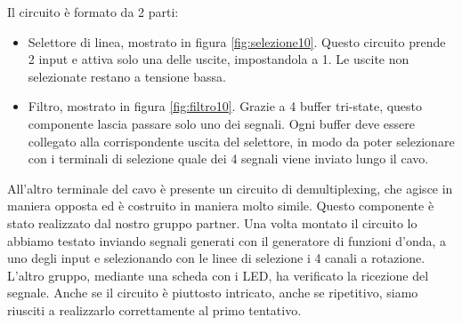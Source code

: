 Il circuito è formato da 2 parti:

\begin{itemize}
    \item{Selettore di linea, mostrato in figura \ref{fig:selezione10}. Questo circuito prende 2 input e
        attiva solo una delle uscite, impostandola a 1. Le uscite non selezionate restano a tensione bassa.}
    \item{Filtro, mostrato in figura \ref{fig:filtro10}. Grazie a 4 buffer tri-state, questo componente lascia
        passare solo uno dei segnali. Ogni buffer deve essere collegato alla corrispondente uscita del selettore,
        in modo da poter selezionare con i terminali di selezione quale dei 4 segnali viene inviato lungo il cavo.}
\end{itemize}

All'altro terminale del cavo è presente un circuito di demultiplexing, che agisce in maniera opposta ed è costruito in
maniera molto simile. Questo componente è stato realizzato dal nostro gruppo partner. Una volta montato il circuito
lo abbiamo testato inviando segnali generati con il generatore di funzioni d'onda, a uno degli input e selezionando
con le linee di selezione i 4 canali a rotazione. L'altro gruppo, mediante una scheda con i LED, ha verificato
la ricezione del segnale. Anche se il circuito è piuttosto intricato, anche se ripetitivo, siamo riusciti a realizzarlo
correttamente al primo tentativo.
